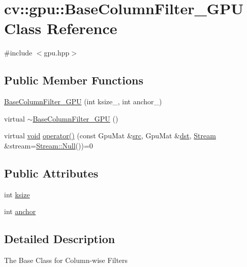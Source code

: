 \hypertarget{classcv_1_1gpu_1_1BaseColumnFilter__GPU}{\section{cv\-:\-:gpu\-:\-:Base\-Column\-Filter\-\_\-\-G\-P\-U Class Reference}
\label{classcv_1_1gpu_1_1BaseColumnFilter__GPU}
}


{\ttfamily \#include $<$gpu.\-hpp$>$}

\subsection*{Public Member Functions}
\begin{DoxyCompactItemize}
\item 
\hyperlink{classcv_1_1gpu_1_1BaseColumnFilter__GPU_a1f79fa59defd9ea1c2042ee1639ae697}{Base\-Column\-Filter\-\_\-\-G\-P\-U} (int ksize\-\_\-, int anchor\-\_\-)
\item 
virtual \hyperlink{classcv_1_1gpu_1_1BaseColumnFilter__GPU_ada24bda7d86e139fa346ad9d34967945}{$\sim$\-Base\-Column\-Filter\-\_\-\-G\-P\-U} ()
\item 
virtual \hyperlink{legacy_8hpp_a8bb47f092d473522721002c86c13b94e}{void} \hyperlink{classcv_1_1gpu_1_1BaseColumnFilter__GPU_a9dc824c0ec9a8e6606eb1ccffcda52e6}{operator()} (const Gpu\-Mat \&\hyperlink{legacy_8hpp_a371cd109b74033bc4366f584edd3dacc}{src}, Gpu\-Mat \&\hyperlink{photo__c_8h_aed13e2a25279b24dc954073233fef7a5}{dst}, \hyperlink{classcv_1_1gpu_1_1Stream}{Stream} \&stream=\hyperlink{classcv_1_1gpu_1_1Stream_af96c23564834f88333dcb8997df553f1}{Stream\-::\-Null}())=0
\end{DoxyCompactItemize}
\subsection*{Public Attributes}
\begin{DoxyCompactItemize}
\item 
int \hyperlink{classcv_1_1gpu_1_1BaseColumnFilter__GPU_afb442622e8a2562273d75a6caf3abc10}{ksize}
\item 
int \hyperlink{classcv_1_1gpu_1_1BaseColumnFilter__GPU_a507a90a96f98e54a315322bb5e735ec2}{anchor}
\end{DoxyCompactItemize}


\subsection{Detailed Description}
The Base Class for Column-\/wise Filters

